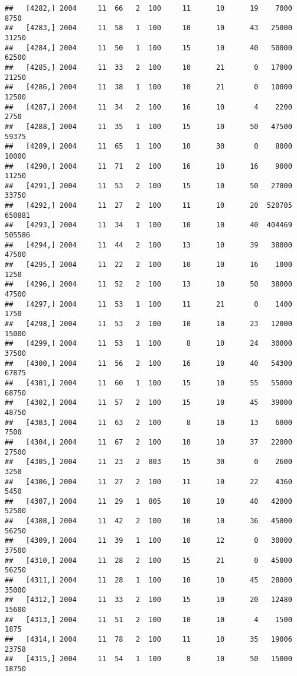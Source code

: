 \documentclass{article}\usepackage[]{graphicx}\usepackage[]{color}
\makeatletter
\newenvironment{kframe}{%
 \def\at@end@of@kframe{}%
 \ifinner\ifhmode%
  \def\at@end@of@kframe{\end{minipage}}%
  \begin{minipage}{\columnwidth}%
 \fi\fi%
 \def\FrameCommand##1{\hskip\@totalleftmargin \hskip-\fboxsep
 \colorbox{shadecolor}{##1}\hskip-\fboxsep
     \hskip-\linewidth \hskip-\@totalleftmargin \hskip\columnwidth}%
 \MakeFramed {\advance\hsize-\width
   \@totalleftmargin\z@ \linewidth\hsize
   \@setminipage}}%
 {\par\unskip\endMakeFramed%
 \at@end@of@kframe}
\newenvironment{knitrout}{}{} %
\makeatother
\begin{document}
\begin{knitrout}
\begin{kframe}
\begin{verbatim}
##   [4282,] 2004     11  66   2  100     11      10      19    7000    8750
##   [4283,] 2004     11  58   1  100     10      10      43   25000   31250
##   [4284,] 2004     11  50   1  100     15      10      40   50000   62500
##   [4285,] 2004     11  33   2  100     10      21       0   17000   21250
##   [4286,] 2004     11  38   1  100     10      21       0   10000   12500
##   [4287,] 2004     11  34   2  100     16      10       4    2200    2750
##   [4288,] 2004     11  35   1  100     15      10      50   47500   59375
##   [4289,] 2004     11  65   1  100     10      30       0    8000   10000
##   [4290,] 2004     11  71   2  100     16      10      16    9000   11250
##   [4291,] 2004     11  53   2  100     15      10      50   27000   33750
##   [4292,] 2004     11  27   2  100     11      10      20  520705  650881
##   [4293,] 2004     11  34   1  100     10      10      40  404469  505586
##   [4294,] 2004     11  44   2  100     13      10      39   38000   47500
##   [4295,] 2004     11  22   2  100     10      10      16    1000    1250
##   [4296,] 2004     11  52   2  100     13      10      50   38000   47500
##   [4297,] 2004     11  53   1  100     11      21       0    1400    1750
##   [4298,] 2004     11  53   2  100     10      10      23   12000   15000
##   [4299,] 2004     11  53   1  100      8      10      24   30000   37500
##   [4300,] 2004     11  56   2  100     16      10      40   54300   67875
##   [4301,] 2004     11  60   1  100     15      10      55   55000   68750
##   [4302,] 2004     11  57   2  100     15      10      45   39000   48750
##   [4303,] 2004     11  63   2  100      8      10      13    6000    7500
##   [4304,] 2004     11  67   2  100     10      10      37   22000   27500
##   [4305,] 2004     11  23   2  803     15      30       0    2600    3250
##   [4306,] 2004     11  27   2  100     11      10      22    4360    5450
##   [4307,] 2004     11  29   1  805     10      10      40   42000   52500
##   [4308,] 2004     11  42   2  100     10      10      36   45000   56250
##   [4309,] 2004     11  39   1  100     10      12       0   30000   37500
##   [4310,] 2004     11  28   2  100     15      21       0   45000   56250
##   [4311,] 2004     11  28   1  100     10      10      45   28000   35000
##   [4312,] 2004     11  33   2  100     15      10      20   12480   15600
##   [4313,] 2004     11  51   2  100     10      10       4    1500    1875
##   [4314,] 2004     11  78   2  100     11      10      35   19006   23758
##   [4315,] 2004     11  54   1  100      8      10      50   15000   18750

\end{verbatim}
\end{kframe}
\end{knitrout}
\end{document}

